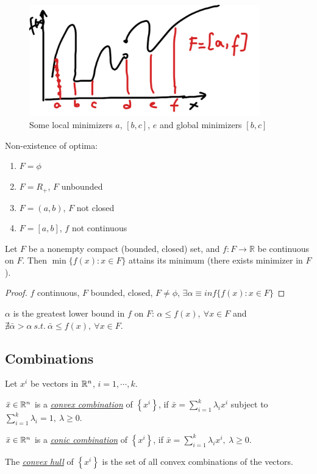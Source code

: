 \documentclass[11pt]{article}
\numberwithin{equation}{section}
\begin{document}
\begin{figure}[H]
    \centering
    \includegraphics[width=10cm]{images/1-ex-1.png}
    \caption{Some local minimizers $a$, $\left[ b,c \right]$, $e$ and global minimizers $\left[ b,c \right]$}
\end{figure}

Non-existence of optima:
\begin{enumerate}[1)]
    \item $F=\phi$
    \item $F=R_+$, $F$ unbounded
    \item $F=(a,b)$, $F$ not closed
    \item $F=[a,b]$, $f$ not continuous
\end{enumerate}

\begin{theorem}\label{eqn:Weierstrass}
    Let $F$ be a nonempty compact (bounded, closed) set, and $f:F\rightarrow \mathbb{R}$ be continuous on $F$. Then $\min\{ f(x):x\in F \}$ attains its minimum (there exists minimizer in $F$).
    \begin{proof}
        $f$ continuous, $F$ bounded, closed, $F\neq \phi$, $\exists \alpha \equiv inf\{f(x):x\in F\}$
    \end{proof}
\end{theorem}

\begin{definition}
    $\alpha$ is the greatest lower bound in $f$ on $F$: $\alpha \leq f(x), \ \forall x \in F$ and $\nexists \bar{\alpha}>\alpha\ s.t.\ \bar{\alpha}\leq f(x), \ \forall x \in F$.
\end{definition}

\subsection{Combinations}
Let $x^i$ be vectors in $\mathbb R^n$, $i=1, \cdots, k$.
\begin{definition}
    $\bar{x} \in \mathbb R^n$ is a \underline{\textit{convex combination}} of $\left\{ x^i \right\}$, if $\bar{x}=\sum_{i=1}^k \lambda_i x^i$ subject to $\sum_{i=1}^k \lambda_i=1, \ \lambda \geq 0$.
\end{definition}
\begin{definition}
    $\bar{x} \in \mathbb R^n$ is a \underline{\textit{conic combination}} of $\left\{ x^i \right\}$, if $\bar{x}=\sum_{i=1}^k \lambda_i x^i, \ \lambda \geq 0$.
\end{definition}
\begin{definition}
    The \underline{\textit{convex hull}} of $\left\{ x^i \right\}$ is the set of all convex combinations of the vectors.
\end{definition}
\end{document}
